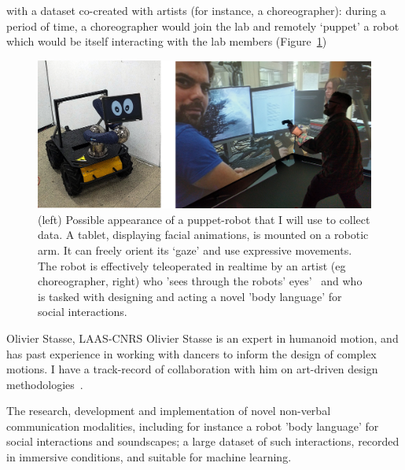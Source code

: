 
 with a dataset co-created with artists (for instance,
a choreographer): during a period of time, a choreographer would join the lab and remotely `puppet'
a robot which would be itself interacting with the lab members
(Figure~\ref{fig:puppet-robot})

\begin{figure}
    \centering
    \includegraphics[width=0.9\linewidth]{figs/puppet.pdf}
    \caption{\label{fig:puppet-robot} (left) Possible appearance of a
    puppet-robot that I will use to collect data. A tablet, displaying facial
    animations, is mounted on a robotic arm.  It can freely orient its `gaze'
    and use expressive movements. The robot is effectively teleoperated in
    realtime by an artist (eg choreographer, right) who 'sees through the
    robots' eyes'~\parencite{bailly2015beaming} and who is tasked with designing and
    acting a novel 'body language' for social interactions.}

\end{figure}

\begin{collaboration}{Olivier Stasse, LAAS-CNRS}
Olivier Stasse is an expert in humanoid motion, and has past experience in
working with dancers to inform the design of complex motions. I have a
track-record of collaboration with him on art-driven design
methodologies~\parencite{lemaignan2012roboscopie}.
\end{collaboration}

\begin{outcome}{2.1}
The research, development and
    implementation of novel non-verbal communication modalities, including for
    instance a robot 'body language' for social interactions and soundscapes; a
    large dataset of such interactions, recorded in immersive conditions, and
    suitable for machine learning.

\end{outcome}


